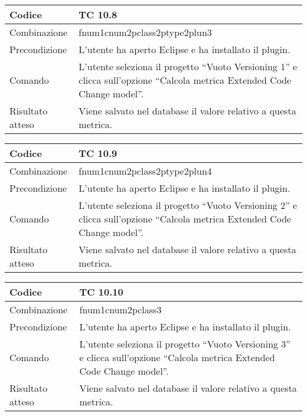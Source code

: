\begin{table}[ht]
\begin{tabular}{|p{3cm}|p{9cm}|}
\hline
\cellcolor{lightgray}Codice				& TC 10.8								\\
\hline
\cellcolor{lightgray}Combinazione		& fnum1cnum2pclass2ptype2plun3									\\
\hline
\cellcolor{lightgray}Precondizione		& L'utente ha aperto Eclipse e ha installato il plugin.		\\
\hline
\cellcolor{lightgray}Comando			& L'utente seleziona il progetto ``Vuoto Versioning 1''  e clicca sull'opzione ``Calcola metrica Extended Code Change model''.	\\
\hline
\cellcolor{lightgray}Risultato atteso	& Viene salvato nel database il valore relativo a questa metrica.\\
\hline
\end{tabular}
\end{table}

\begin{table}[ht]
\begin{tabular}{|p{3cm}|p{9cm}|}
\hline
\cellcolor{lightgray}Codice				& TC 10.9								\\
\hline
\cellcolor{lightgray}Combinazione		& fnum1cnum2pclass2ptype2plun4									\\
\hline
\cellcolor{lightgray}Precondizione		& L'utente ha aperto Eclipse e ha installato il plugin.		\\
\hline
\cellcolor{lightgray}Comando			& L'utente seleziona il progetto ``Vuoto Versioning 2''  e clicca sull'opzione ``Calcola metrica Extended Code Change model''.	\\
\hline
\cellcolor{lightgray}Risultato atteso	& Viene salvato nel database il valore relativo a questa metrica.\\
\hline
\end{tabular}
\end{table}

\begin{table}[ht]
\begin{tabular}{|p{3cm}|p{9cm}|}
\hline
\cellcolor{lightgray}Codice				& TC 10.10								\\
\hline
\cellcolor{lightgray}Combinazione		& fnum1cnum2pclass3									\\
\hline
\cellcolor{lightgray}Precondizione		& L'utente ha aperto Eclipse e ha installato il plugin.		\\
\hline
\cellcolor{lightgray}Comando			& L'utente seleziona il progetto ``Vuoto Versioning 3''  e clicca sull'opzione ``Calcola metrica Extended Code Change model''.	\\
\hline
\cellcolor{lightgray}Risultato atteso	& Viene salvato nel database il valore relativo a questa metrica.\\
\hline
\end{tabular}
\end{table}

